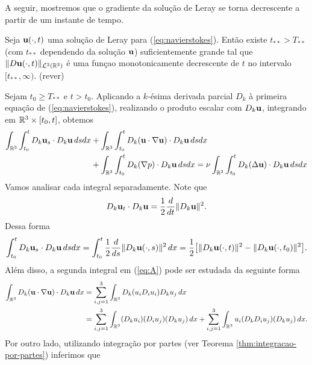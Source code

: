 A seguir, mostremos que o gradiente da solução de Leray se torna decrescente a partir de um instante de tempo.

\begin{pbox} \label{pr:tstar}
    Seja $\mathbf{u}(\cdot,t)$ uma solução de Leray para (\ref{eq:navierstokes}). Então existe $t_{**} > T_{**}$ (com $t_{**}$ dependendo da solução $\mathbf{u}$) suficientemente grande tal que $\Vert D\mathbf{u}(\cdot,t) \Vert_{\mathcal{L}^2(\mathbb{R}^3)}$ é uma funçao monotonicamente decrescente de $t$ no intervalo $[t_{**}, \infty)$. (rever)
\end{pbox}
\begin{prf}
    Sejam $t_0 \geqslant T_{**}$ e $t > t_0$.
    Aplicando a $k$-ésima derivada parcial $D_k$ à primeira equação de (\ref{eq:navierstokes}), realizando o produto escalar com $D_k \mathbf{u}$, integrando em $\mathbb{R}^3 \times [t_0,t]$, obtemos
    \begin{equation} \label{eq:A}
        \begin{aligned}
            \int_{\mathbb{R}^3} \int_{t_0}^t D_k \mathbf{u}_s \cdot D_k \mathbf{u} \,dsdx &+ \int_{\mathbb{R}^3} \int_{t_0}^t D_k (\mathbf{u} \cdot \nabla \mathbf{u}) \cdot D_k \mathbf{u} \,dsdx\\ 
            &+ \int_{\mathbb{R}^3} \int_{t_0}^t D_k (\nabla p) \cdot D_k\mathbf{u} \,dsdx = \nu \int_{\mathbb{R}^3} \int_{t_0}^t D_k (\Delta \mathbf{u}) \cdot D_k \mathbf{u} \,dsdx
        \end{aligned}
    \end{equation}
    Vamos analisar cada integral separadamente.
    Note que
    \[
        D_k \mathbf{u}_t \cdot D_k \mathbf{u} = \frac{1}{2} \frac{d}{dt} \Vert D_k \mathbf{u} \Vert^2.
    \]
    Dessa forma 
    \[
        \int_{t_0}^t D_k \mathbf{u}_s \cdot D_k \mathbf{u} \,dsdx = \int_{t_0}^t \frac{1}{2} \frac{d}{ds} \Vert D_k \mathbf{u}(\cdot,s) \Vert^2 \,dx =  \frac{1}{2} \big[ \Vert D_k \mathbf{u}(\cdot,t) \Vert^2 -  \Vert D_k \mathbf{u}(\cdot,t_0) \Vert^2 \big] .
    \]
    Além disso, a segunda integral em (\ref{eq:A}) pode ser estudada da seguinte forma
    \begin{align}
            \int_{\mathbb{R}^3} D_k (\mathbf{u} \cdot \nabla \mathbf{u}) \cdot D_k \mathbf{u} \,dx &= \sum_{i,j=1}^3 \int_{\mathbb{R}^3} D_k (u_i D_i u_i) D_k u_j \,dx \label{eq:xx1}\\
            &= \sum_{i,j=1}^3 \int_{\mathbb{R}^3} (D_k u_i) (D_i u_j)(D_k u_j) \,dx + \sum_{i,j=1}^3 \int_{\mathbb{R}^3} u_i (D_k D_i u_j) (D_k u_j)\,dx. \nonumber
    \end{align}
    Por outro lado, utilizando integração por partes (ver Teorema \ref{thm:integracao-por-partes}) inferimos que
    \[
        \begin{aligned}

\end{aligned}\]
\end{prf}
